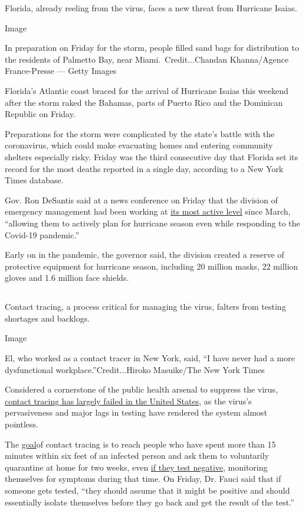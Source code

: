 Florida, already reeling from the virus, faces a new threat from
Hurricane Isaias.

Image

In preparation on Friday for the storm, people filled sand bags for
distribution to the residents of Palmetto Bay, near
Miami.~Credit...Chandan Khanna/Agence France-Presse --- Getty Images

Florida's Atlantic coast braced for the arrival of Hurricane Isaias this
weekend after the storm raked the Bahamas, parts of Puerto Rico and the
Dominican Republic on Friday.

Preparations for the storm were complicated by the state's battle with
the coronavirus, which could make evacuating homes and entering
community shelters especially risky. Friday was the third consecutive
day that Florida set its record for the most deaths reported in a single
day, according to a New York Times database.

Gov. Ron DeSantis said at a news conference on Friday that the division
of emergency management had been working at
\href{https://www.floridadisaster.org/sert/eoc-activation-levels/}{its
most active level} since March, ``allowing them to actively plan for
hurricane season even while responding to the Covid-19 pandemic.''

Early on in the pandemic, the governor said, the division created a
reserve of protective equipment for hurricane season, including 20
million masks, 22 million gloves and 1.6 million face shields.

\hypertarget{-5}{%
\subsection{}\label{-5}}

Contact tracing, a process critical for managing the virus, falters from
testing shortages and backlogs.

Image

El, who worked as a contact tracer in New York, said, ``I have never had
a more dysfunctional workplace.''Credit...Hiroko Masuike/The New York
Times

Considered a cornerstone of the public health arsenal to suppress the
virus,
\href{https://www.nytimes3xbfgragh.onion/2020/07/31/health/covid-contact-tracing-tests.html}{contact
tracing has largely failed in the United States}, as the virus's
pervasiveness and major lags in testing have rendered the system almost
pointless.

The
\href{https://www.cdc.gov/coronavirus/2019-ncov/php/contact-tracing/contact-tracing-plan/contact-tracing.html}{goal}of
contact tracing is to reach people who have spent more than 15 minutes
within six feet of an infected person and ask them to voluntarily
quarantine at home for two weeks, even
\href{https://www.cdc.gov/coronavirus/2019-ncov/symptoms-testing/testing.html}{if
they test negative}, monitoring themselves for symptoms during that
time. On Friday, Dr. Fauci said that if someone gets tested, ``they
should assume that it might be positive and should essentially isolate
themselves before they go back and get the result of the test.''

